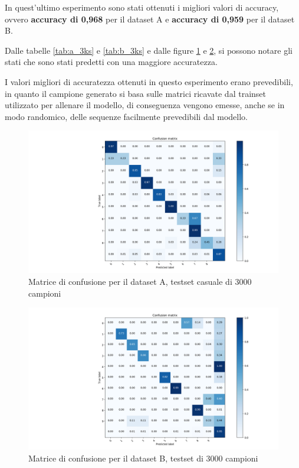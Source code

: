 \documentclass[10pt,a4paper]{article}
\begin{document}
	In quest'ultimo esperimento sono stati ottenuti i migliori valori di accuracy, ovvero \textbf{accuracy di 0,968} per il dataset A e \textbf{accuracy di 0,959} per il dataset B.
	
	Dalle tabelle \ref{tab:a_3ks} e \ref{tab:b_3ks} e dalle figure \ref{fig:a_3ks} e \ref{fig:b_3ks}, si possono notare gli stati che sono stati predetti con una maggiore accuratezza.
	
	I valori migliori di accuratezza ottenuti in questo esperimento erano prevedibili, in quanto il campione generato si basa sulle matrici ricavate dal trainset utilizzato per allenare il modello, di conseguenza vengono emesse, anche se in modo randomico, delle sequenze facilmente prevedibili dal modello. 
	
	
	
	
	\begin{figure}[!htbp]
	\includegraphics[width=\linewidth]{immagini/confusion_matrix/a_3ks.png}
	\caption{Matrice di confusione per il dataset A, testset casuale di 3000 campioni}
	\label{fig:a_3ks}
	\end{figure}
	
	\begin{figure}[!htbp]
	\includegraphics[width=\linewidth]{immagini/confusion_matrix/b_3ks.png}
	\caption{Matrice di confusione per il dataset B, testset di 3000 campioni}
	\label{fig:b_3ks}
	\end{figure}
	
\end{document}
